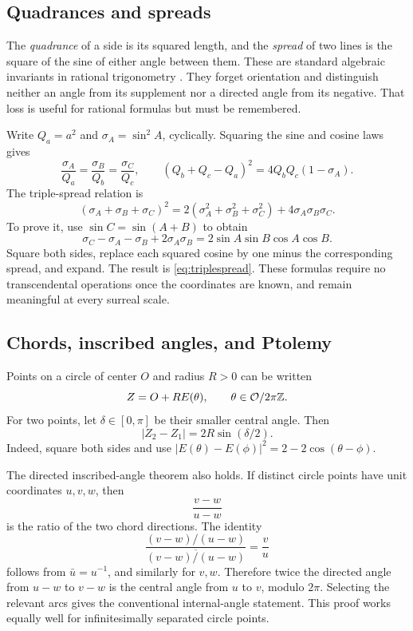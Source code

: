 \documentclass[11pt,letterpaper]{article}
\theoremstyle{definition}
\theoremstyle{remark}
\newcommand{\OO}{\mathcal O}\newcommand{\mm}{\mathfrak m}
\numberwithin{equation}{section}
\begin{document}
\subsection{Quadrances and spreads}
The \emph{quadrance} of a side is its squared length, and the \emph{spread} of two lines is the square of the sine of either angle between them. These are standard algebraic invariants in rational trigonometry \cite{Wildberger,Gunn}. They forget orientation and distinguish neither an angle from its supplement nor a directed angle from its negative. That loss is useful for rational formulas but must be remembered.

Write $Q_a=a^2$ and $\sigma_A=\sin^2A$, cyclically. Squaring the sine and cosine laws gives
\begin{equation}\label{eq:spreadlaws}
 \frac{\sigma_A}{Q_a}=\frac{\sigma_B}{Q_b}=\frac{\sigma_C}{Q_c},
 \qquad
 (Q_b+Q_c-Q_a)^2=4Q_bQ_c(1-\sigma_A).
\end{equation}
The triple-spread relation is
\begin{equation}\label{eq:triplespread}
 (\sigma_A+\sigma_B+\sigma_C)^2
 =2(\sigma_A^2+\sigma_B^2+\sigma_C^2)
   +4\sigma_A\sigma_B\sigma_C.
\end{equation}
To prove it, use $\sin C=\sin(A+B)$ to obtain
\[
 \sigma_C-\sigma_A-\sigma_B+2\sigma_A\sigma_B
 =2\sin A\sin B\cos A\cos B.
\]
Square both sides, replace each squared cosine by one minus the corresponding spread, and expand. The result is \eqref{eq:triplespread}. These formulas require no transcendental operations once the coordinates are known, and remain meaningful at every surreal scale.

\subsection{Chords, inscribed angles, and Ptolemy}
Points on a circle of center $O$ and radius $R>0$ can be written
\[
 Z=O+RE(\theta),\qquad \theta\in\OO/2\pi\Z.
\]
For two points, let $\delta\in[0,\pi]$ be their smaller central angle. Then
\begin{equation}\label{eq:chord}
 |Z_2-Z_1|=2R\sin(\delta/2).
\end{equation}
Indeed, square both sides and use $|E(\theta)-E(\phi)|^2=2-2\cos(\theta-\phi)$.

The directed inscribed-angle theorem also holds. If distinct circle points have unit coordinates $u,v,w$, then
\[
 \frac{v-w}{u-w}
\]
is the ratio of the two chord directions. The identity
\[
 \frac{(v-w)/(u-w)}{\overline{(v-w)/(u-w)}}=\frac vu
\]
follows from $\bar u=u^{-1}$, and similarly for $v,w$. Therefore twice the directed angle from $u-w$ to $v-w$ is the central angle from $u$ to $v$, modulo $2\pi$. Selecting the relevant arcs gives the conventional internal-angle statement. This proof works equally well for infinitesimally separated circle points.
\end{document}
